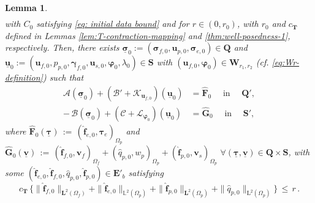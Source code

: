 \documentclass[11pt]{article}
\numberwithin{equation}{section}
\newcommand{\bgamma}{{\boldsymbol\gamma}}
\newcommand{\bsi}{{\boldsymbol\sigma}}
\newcommand{\bvarphi}{{\boldsymbol\varphi}}
\newcommand{\btau}{{\boldsymbol\tau}}
\newcommand{\ubsi}{\underline{\bsi}}
\newcommand{\ubtau}{\underline{\btau}}
\newcommand{\ubu}{\underline{\bu}}
\newcommand{\ubv}{\underline{\bv}}
\newcommand{\bv}{{\mathbf{v}}}
\newcommand{\f}{\mathbf{f}}
\newcommand{\bu}{\mathbf{u}}
\newcommand{\0}{{\mathbf{0}}}
\def\bE{\mathbf{E}}
\def\bF{\mathbf{F}}
\def\bG{\mathbf{G}}
\def\bW{\mathbf{W}}
\def\bT{\mathbf{T}}
\def\bQ{\mathbf{Q}}
\def\bS{\mathbf{S}}
\newcommand{\bL}{\mathbf{L}}
\newcommand\bbL{\mathbb{L}}
\newcommand{\cA}{\mathcal{A}}
\newcommand{\cB}{\mathcal{B}}
\newcommand{\cC}{\mathcal{C}}
\newcommand{\cK}{\mathcal{K}}
\newcommand{\cL}{\mathcal{L}}
\def\L{\mathrm{L}}
\def\wh{\widehat}
\newtheorem{lem}[thm]{Lemma}
\numberwithin{equation}{section}
\begin{document}
\begin{lem}
\begin{align}
\end{align}
with $C_0$ satisfying \eqref{eq: initial data bound} and
for $r\in (0,r_0)$, with $r_0$ and $c_\bT$ defined in Lemmas \ref{lem:T-contraction-mapping} and \ref{thm:well-posedness-1}, respectively. Then, there exists $\ubsi_0 := (\bsi_{f,0}, \bu_{p,0},\bsi_{e,0})\in \bQ$ and   $\ubu_0 := (\bu_{f,0},p_{p,0},\bgamma_{f,0},\bu_{s,0},\bvarphi_0, \lambda_0)\in \bS$  with $(\bu_{f,0},\bvarphi_0)\in \bW_{r_1,r_2}$ (cf. \eqref{eq:Wr-definition}) such that 
\begin{align}
\cA(\ubsi_0) + (\cB' + \cK_{\bu_{f,0}})(\ubu_0) &=  \wh{\bF}_0 \quad \mbox{ in }\quad  \bQ', \nonumber\\ 
-\,\cB(\ubsi_0) + ( \cC +\cL_{\bvarphi_0})(\ubu_0) &=  \wh{\bG}_0  \quad \mbox{ in } \quad \bS', \label{eq:initial-data-system}
\end{align}
where $\wh{\bF}_0(\ubtau) \,:=\, (\wh{\f}_{e,0},\btau_e)_{\Omega_p}$ and 
$\wh{\bG}_0(\ubv) \,:=\, (\wh{\f}_{f,0},\bv_f)_{\Omega_f} + (\wh{q}_{p,0},w_p)_{\Omega_p} + (\wh{\f}_{p,0},\bv_s)_{\Omega_p}\,\,  \forall  (\ubtau,\ubv)\in \bQ\times \bS$,
with some $(\wh{\f}_{e,0}, \wh{\f}_{f,0}, \wh{q}_{p,0},\wh{\f}_{p,0})\in \bE'_b$ satisfying
%
\begin{equation}\label{eq:initial-data-bound-1}
{c_\bT\,\Big\{ \|\wh{\f}_{f,0}\|_{\bL^2(\Omega_f)} +  \|\wh{\f}_{e,0}\|_{\bbL^2(\Omega_p)}+ \|\wh{\f}_{p,0}\|_{\bL^2(\Omega_p)} + \|\wh{q}_{p,0}\|_{\L^2(\Omega_p)} \Big\}} 
\,\leq\, r \,.
\end{equation}
\end{lem}
%
\end{document}
